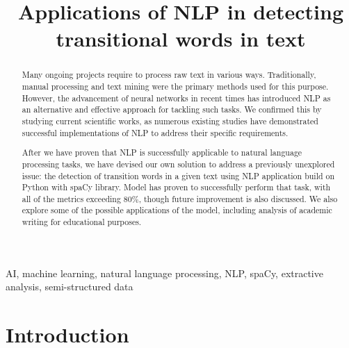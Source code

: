\documentclass[conference]{IEEEtran}
\begin{document}
\title{Applications of NLP in detecting transitional words in text\\
}

\author{
\and
{}
}

\maketitle

\begin{abstract}
Many ongoing projects require to process raw text in various ways. Traditionally, manual processing and text mining were the primary methods used for this purpose. However, the advancement of neural networks in recent times has introduced NLP as an alternative and effective approach for tackling such tasks. We confirmed this by studying current scientific works, as numerous existing studies have demonstrated successful implementations of NLP to address their specific requirements.

After we have proven that NLP is successfully applicable to natural language processing tasks, we have devised our own solution to address a previously unexplored issue: the detection of transition words in a given text using NLP application build on Python with spaCy library. Model has proven to successfully perform that task, with all of the metrics exceeding 80\%, though future improvement is also discussed. We also explore some of the possible applications of the model, including analysis of academic writing for educational purposes.
\end{abstract}

\begin{IEEEkeywords}
AI, machine learning, natural language processing, NLP, spaCy, extractive analysis, semi-structured data
\end{IEEEkeywords}

\section{Introduction}
\end{document}

